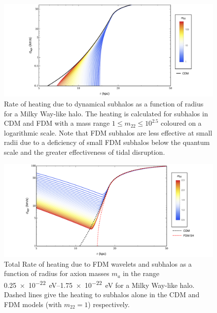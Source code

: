 \documentclass[usenatbib]{mnras}
\begin{document}
\begin{figure}
\includegraphics[width= 17cm]{CDM_velocity}
\caption{Rate of heating due to dynamical subhalos as a function of radius for a Milky Way-like halo. The heating is calculated for subhalos in CDM and FDM with a mass range $1 \le m_{22} \le 10^{2.5}$ coloured on a logarithmic scale. Note that FDM subhalos are less effective at small radii due to a deficiency of small FDM subhalos below the quantum scale and the greater effectiveness of tidal disruption.}
\label{fig:CDMheating}
\end{figure}
\begin{figure}
\includegraphics[width=17cm]{FDM_velocity}
\caption{Total Rate of heating due to FDM wavelets and subhalos as a function of radius for axion masses $m_{a}$ in the range \SIrange{0.25 e-22}{ 1.75 e-22}{\electronvolt} for a Milky Way-like halo. Dashed lines give the heating to subhalos alone in the CDM and FDM models (with $m_{22} = 1$) respectively.}
\label{fig:radiusheating}
\end{figure}
\end{document}
